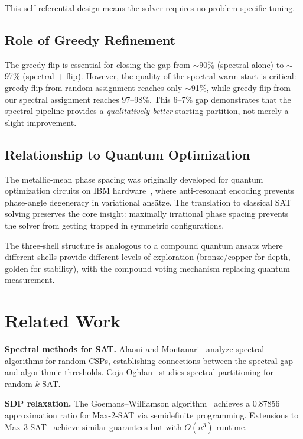 \documentclass[11pt,a4paper]{article}
\begin{document}
This self-referential design means the solver requires no
problem-specific tuning.

\subsection{Role of Greedy Refinement}

The greedy flip is essential for closing the gap from $\sim$90\%
(spectral alone) to $\sim$97\% (spectral + flip). However, the quality
of the spectral warm start is critical: greedy flip from random
assignment reaches only $\sim$91\%, while greedy flip from our spectral
assignment reaches 97--98\%. This 6--7\% gap demonstrates that the
spectral pipeline provides a \emph{qualitatively better} starting
partition, not merely a slight improvement.

\subsection{Relationship to Quantum Optimization}

The metallic-mean phase spacing was originally developed for quantum
optimization circuits on IBM hardware~\cite{knopp2026arpt}, where
anti-resonant encoding prevents phase-angle degeneracy in variational
ans\"atze. The translation to classical SAT solving preserves the core
insight: maximally irrational phase spacing prevents the solver from
getting trapped in symmetric configurations.

The three-shell structure is analogous to a compound quantum ansatz
where different shells provide different levels of exploration
(bronze/copper for depth, golden for stability), with the compound
voting mechanism replacing quantum measurement.

\section{Related Work}

\textbf{Spectral methods for SAT.}
Alaoui and Montanari~\cite{alaoui2014spectral} analyze spectral
algorithms for random CSPs, establishing connections between the
spectral gap and algorithmic thresholds.
Coja-Oghlan~\cite{coja2010graph} studies spectral partitioning for
random $k$-SAT.

\textbf{SDP relaxation.}
The Goemans--Williamson algorithm~\cite{goemans1995improved} achieves
a 0.87856 approximation ratio for Max-2-SAT via semidefinite
programming. Extensions to Max-3-SAT~\cite{karloff1997max3sat} achieve
similar guarantees but with $O(n^3)$ runtime.
\end{document}
